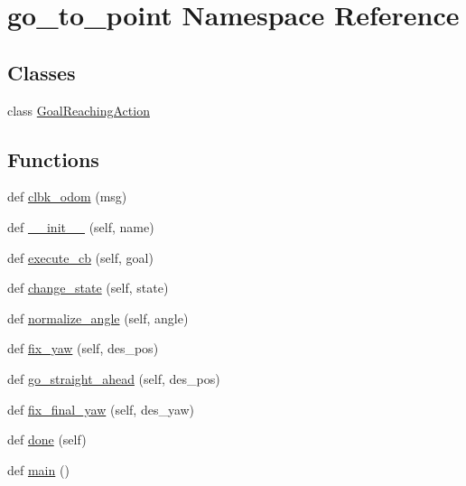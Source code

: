 \hypertarget{namespacego__to__point}{}\section{go\+\_\+to\+\_\+point Namespace Reference}
\label{namespacego__to__point}
\subsection*{Classes}
\begin{DoxyCompactItemize}
\item 
class \hyperlink{classgo__to__point_1_1_goal_reaching_action}{Goal\+Reaching\+Action}
\end{DoxyCompactItemize}
\subsection*{Functions}
\begin{DoxyCompactItemize}
\item 
def \hyperlink{namespacego__to__point_a36304a9f313b0579f7fc69fa01695524}{clbk\+\_\+odom} (msg)
\item 
def \hyperlink{namespacego__to__point_a0961ae1b210549fe6c6567bf94fb17c6}{\+\_\+\+\_\+init\+\_\+\+\_\+} (self, name)
\item 
def \hyperlink{namespacego__to__point_a1d2c03bc184771298197eab5e767d6ea}{execute\+\_\+cb} (self, goal)
\item 
def \hyperlink{namespacego__to__point_a4f1a4b111176c2378561c682f5cd68d5}{change\+\_\+state} (self, state)
\item 
def \hyperlink{namespacego__to__point_a1cd6e02fd38e089c594553582950ddff}{normalize\+\_\+angle} (self, angle)
\item 
def \hyperlink{namespacego__to__point_a1f6208418b094f03418e1b37c16efc72}{fix\+\_\+yaw} (self, des\+\_\+pos)
\item 
def \hyperlink{namespacego__to__point_ad3957571eb3e72a058d16b44d509e693}{go\+\_\+straight\+\_\+ahead} (self, des\+\_\+pos)
\item 
def \hyperlink{namespacego__to__point_afe89abac4cdb91adb7848ceb7aff4c0c}{fix\+\_\+final\+\_\+yaw} (self, des\+\_\+yaw)
\item 
def \hyperlink{namespacego__to__point_ad537df6ce92476d81b2de4048ea1732f}{done} (self)
\item 
def \hyperlink{namespacego__to__point_ab92bd6db1ec323a4d795ed6cb40aebe1}{main} ()
\end{DoxyCompactItemize}
